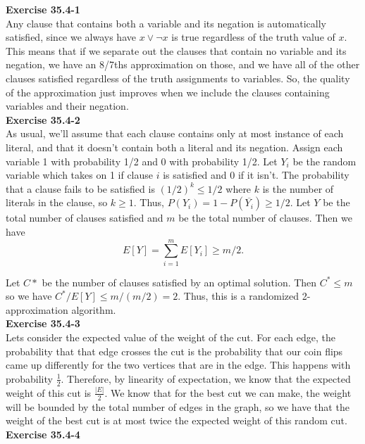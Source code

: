\documentclass{article}
\begin{document}
\noindent\textbf{Exercise 35.4-1}\\

Any clause that contains both a variable and its negation is automatically satisfied, since we always have $x \vee \neg x$ is true regardless of the truth value of $x$. This means that if we separate out the clauses that contain no variable and its negation, we have an 8/7ths approximation on those, and we have all of the other clauses satisfied regardless of the truth assignments to variables. So, the quality of the approximation just improves when we include the clauses containing variables and their negation.\\

\noindent\textbf{Exercise 35.4-2}\\

As usual, we'll assume that each clause contains only at most instance of each literal, and that it doesn't contain both a literal and its negation.  Assign each variable 1 with probability 1/2 and 0 with probability 1/2.  Let $Y_i$ be the random variable which takes on 1 if clause $i$ is satisfied and 0 if it isn't.  The probability that a clause fails to be satisfied is $(1/2)^k \leq 1/2$ where $k$ is the number of literals in the clause, so $k \geq 1$. Thus, $P(Y_i) = 1 - P(\overline{Y_i}) \geq 1/2$.  Let $Y$ be the total number of clauses satisfied and $m$ be the total number of clauses.  Then we have
\[ E[Y] = \sum_{i=1}^m E[Y_i] \geq m/2.\]

Let $C*$ be the number of clauses satisfied by an optimal solution.  Then $C^* \leq m$ so we have $C^*/ E[Y] \leq m/(m/2) = 2$. Thus, this is a randomized 2-approximation algorithm. \\

\noindent\textbf{Exercise 35.4-3}\\

Lets consider the expected value of the weight of the cut. For each edge, the probability that that edge crosses the cut is the probability that our coin flips came up differently for the two vertices that are in the edge. This happens with probability $\frac{1}{2}$. Therefore, by linearity of expectation, we know that the expected weight of this cut is $\frac{|E|}{2}$. We know that for the best cut we can make, the weight will be bounded by the total number of edges in the graph, so we have that the weight of the best cut is at most twice the expected weight of this random cut.\\

\noindent\textbf{Exercise 35.4-4}\\
\end{document}
